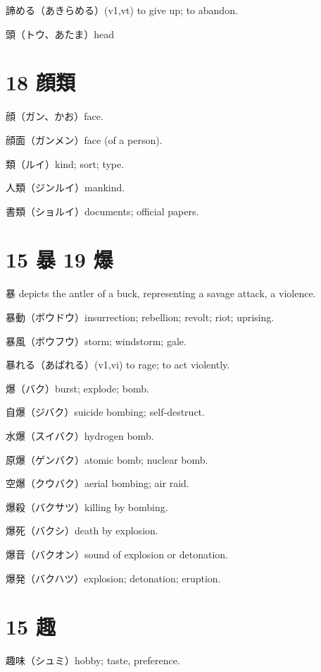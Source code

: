 諦める（あきらめる）(v1,vt)
to give up; to abandon.

頭（トウ、あたま）head

\section{18 顔類}

顔（ガン、かお）face.

顔面（ガンメン）face (of a person).

類（ルイ）kind; sort; type.

人類（ジンルイ）mankind.

書類（ショルイ）documents; official papers.

\section{15 暴 19 爆}

暴 depicts the antler of a buck, representing a savage attack, a violence.

暴動（ボウドウ）insurrection; rebellion; revolt; riot; uprising.

暴風（ボウフウ）storm; windstorm; gale.

暴れる（あばれる）(v1,vi) to rage; to act violently.

爆（バク）burst; explode; bomb.

自爆（ジバク）suicide bombing; self-destruct.

水爆（スイバク）hydrogen bomb.

原爆（ゲンバク）atomic bomb; nuclear bomb.

空爆（クウバク）aerial bombing; air raid.

爆殺（バクサツ）killing by bombing.

爆死（バクシ）death by explosion.

爆音（バクオン）sound of explosion or detonation.

爆発（バクハツ）explosion; detonation; eruption.

\section{15 趣}

趣味（シュミ）hobby; taste, preference.
